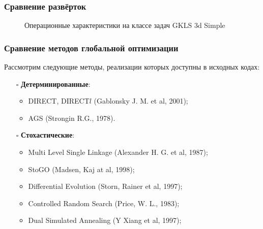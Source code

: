 \documentclass[aspectratio=1610]{beamer}
\begin{document}
\begin{frame}
  \frametitle{Сравнение развёрток}
  \begin{figure}[ht]
    \hspace*{-0.9cm}
    \caption{Операционные характеристики на классе задач GKLS 3d Simple}
  \end{figure}
\end{frame}


\begin{frame}
  \frametitle{Сравнение методов глобальной оптимизации}
  Рассмотрим следующие методы, реализации которых доступны в исходных кодах:
  \begin{itemize}
    \item[$\square$] \textbf{Детерминированные}:
    \begin{itemize}
      \item DIRECT, DIRECT$l$ (Gablonsky J. M. et al, 2001);
      \item AGS (Strongin R.G., 1978).
    \end{itemize}
    \item[$\square$] \textbf{Стохастические}:
    \begin{itemize}
      \item Multi Level Single Linkage (Alexander H. G. et al, 1987);
      \item StoGO (Madsen, Kaj at al, 1998);
      \item Differential Evolution (Storn, Rainer et al, 1997);
      \item Controlled Random Search (Price, W. L., 1983);
      \item Dual Simulated Annealing (Y Xiang et al, 1997);
    \end{itemize}
  \end{itemize}
\end{frame}
\end{document}
